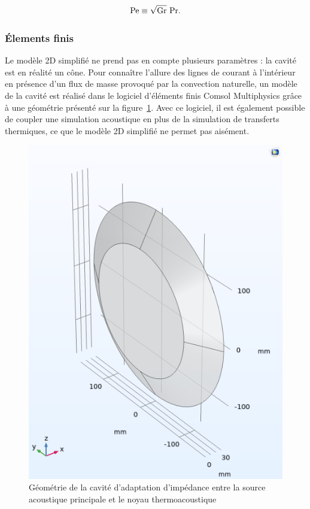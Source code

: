 \begin{equation}
	\mathrm{Pe} \equiv \sqrt{\mathrm{Gr}}~\mathrm{Pr}.
	\label{eq:NbrPeclet_GrashofFoisPrandtl}
\end{equation}


\subsubsection{\'Elements finis}
Le modèle 2D simplifié ne prend pas en compte plusieurs paramètres : la cavité est en réalité un cône. Pour connaître l'allure des lignes de courant à l'intérieur en présence d'un flux de masse provoqué par la convection naturelle, un modèle de la cavité est réalisé dans le logiciel d'éléments finis Comsol Multiphysics grâce à une géométrie présenté sur la figure~\ref{fig:CaviteConvNat_ComsolGeometrie}. Avec ce logiciel, il est également possible de coupler une simulation acoustique en plus de la simulation de transferts thermiques, ce que le modèle 2D simplifié ne permet pas aisément.
\begin{figure}[!ht]
    \centering
    \includegraphics[width=.5\textwidth]{../fig/fig_ConvNatComsol/Geometry.png}
    \caption{Géométrie de la cavité d'adaptation d'impédance entre la source acoustique principale et le noyau thermoacoustique}
    \label{fig:CaviteConvNat_ComsolGeometrie}
\end{figure}

